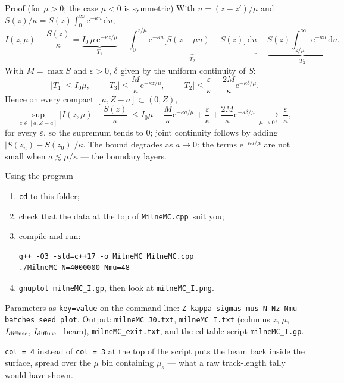 \documentclass[aspectratio=169,10pt]{beamer}
\renewcommand{\d}{\,\mathrm{d}}
\newcommand{\e}{\mathrm{e}}
\newcommand{\MC}{\texttt{MilneMC.cpp}}
\begin{document}
\begin{frame}{Proof (for $\mu>0$; the case $\mu<0$ is symmetric)}
With $u=(z-z')/\mu$ and $S(z)/\kappa=S(z)\int_0^\infty\e^{-\kappa u}\d u$,
\[
I(z,\mu)-\frac{S(z)}\kappa
=\underbrace{I_0\,\mu\,\e^{-\kappa z/\mu}}_{T_1}
+\underbrace{\int_0^{z/\mu}\e^{-\kappa u}\big[S(z-\mu u)-S(z)\big]\d u}_{T_2}
-\underbrace{S(z)\int_{z/\mu}^{\infty}\e^{-\kappa u}\d u}_{T_3}.
\]
With $M=\max S$ and $\varepsilon>0$, $\delta$ given by the uniform continuity of $S$:
\[
|T_1|\le I_0\mu,\qquad |T_3|\le\frac M\kappa\e^{-\kappa z/\mu},\qquad
|T_2|\le\frac\varepsilon\kappa+\frac{2M}\kappa\e^{-\kappa\delta/\mu}.
\]
Hence on every compact $[a,Z-a]\subset(0,Z)$,
\[
\sup_{z\in[a,Z-a]}\Big|I(z,\mu)-\frac{S(z)}\kappa\Big|
\le I_0\mu+\frac M\kappa\e^{-\kappa a/\mu}+\frac\varepsilon\kappa
+\frac{2M}\kappa\e^{-\kappa\delta/\mu}\ \xrightarrow[\mu\to0^+]{}\ \frac\varepsilon\kappa ,
\]
for every $\varepsilon$, so the supremum tends to $0$; joint continuity follows by adding
$|S(z_n)-S(z_0)|/\kappa$. The bound degrades as $a\to0$: the terms $\e^{-\kappa a/\mu}$ are
not small when $a\lesssim\mu/\kappa$ --- the boundary layers.
\end{frame}

\begin{frame}[fragile]{Using the program}
\begin{enumerate}
\item \texttt{cd} to this folder;
\item check that the data at the top of \MC\ suit you;
\item compile and run:
\begin{verbatim}
g++ -O3 -std=c++17 -o MilneMC MilneMC.cpp
./MilneMC N=4000000 Nmu=48
\end{verbatim}
\item \texttt{gnuplot milneMC\_I.gp}, then look at \texttt{milneMC\_I.png}.
\end{enumerate}
\medskip

Parameters as \texttt{key=value} on the command line: \texttt{Z kappa sigmas mus N Nz Nmu
batches seed plot}. Output: \texttt{milneMC\_J0.txt}, \texttt{milneMC\_I.txt}
(columns $z$, $\mu$, $I_{\rm diffuse}$, $I_{\rm diffuse}+$beam),
\texttt{milneMC\_exit.txt}, and the editable script \texttt{milneMC\_I.gp}.
\medskip

{\footnotesize \texttt{col = 4} instead of \texttt{col = 3} at the top of the script puts
the beam back inside the surface, spread over the $\mu$ bin containing $\mu_s$ --- what a
raw track-length tally would have shown.}
\end{frame}
\end{document}
